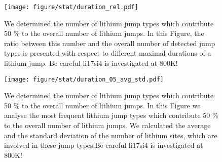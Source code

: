 \documentclass{article}
\begin{document}
\begin{figure}[h!]
\centering
\texttt{[image: figure/stat/duration\_rel.pdf]}
\caption{We determined the number of lithium  jump types which contribute 50 \% to the overall number of lithium jumps. In this Figure, the ratio between this number and the overall number of detected  jump types  is presented with respect to different maximal durations of a lithium jump. Be careful li17si4 is investigated at 800K! }    
\label{fig:4}
\end{figure}


\begin{figure}[h!]
\centering
\texttt{[image: figure/stat/duration\_05\_avg\_std.pdf]}
\caption{We determined the number of lithium  jump types which contribute 50 \% to the overall number of lithium jumps. 
In this Figure we analyse the  most frequent lithium jump types which contribute 50 \% to the overall number of lithium jumps. 
We calculated the average and the standard deviation of the number of lithium sites, which are involved in these jump types.Be careful li17si4 is investigated at 800K! }
\label{fig:5}
\end{figure}

\FloatBarrier
\end{document}
